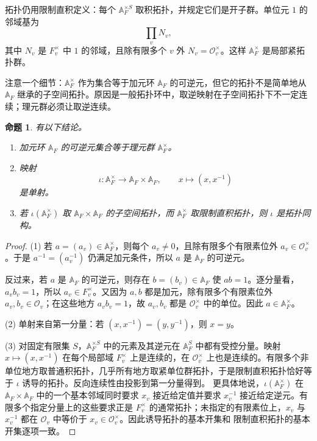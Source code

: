 \documentclass[11pt,a4paper,openany]{ctexbook}
\numberwithin{equation}{chapter}
\newcommand{\A}{\mathbb{A}}
\theoremstyle{plain}
\newtheorem{proposition}[theorem]{命题}
\theoremstyle{definition}
\theoremstyle{remark}
\begin{document}
拓扑仍用限制直积定义：每个 $\A_F^{\times S}$ 取积拓扑，并规定它们是开子群。单位元 $1$ 的邻域基为
\[
 \prod_vN_v,
\]
其中 $N_v$ 是 $F_v^\times$ 中 $1$ 的邻域，且除有限多个 $v$ 外 $N_v=\mathcal O_v^\times$。这样 $\A_F^\times$ 是局部紧拓扑群。

注意一个细节：$\A_F^\times$ 作为集合等于加元环 $\A_F$ 的可逆元，但它的拓扑不是简单地从 $\A_F$ 继承的子空间拓扑。原因是一般拓扑环中，取逆映射在子空间拓扑下不一定连续；理元群必须让取逆连续。

\begin{proposition}
有以下结论。
\begin{enumerate}[label=(\arabic*)]
\item 加元环 $\A_F$ 的可逆元集合等于理元群 $\A_F^\times$。
\item 映射
\[
 \iota:\A_F^\times\longrightarrow \A_F\times\A_F,\qquad
 x\longmapsto (x,x^{-1})
\]
是单射。
\item 若 $\iota(\A_F^\times)$ 取 $\A_F\times\A_F$ 的子空间拓扑，而 $\A_F^\times$ 取限制直积拓扑，则 $\iota$ 是拓扑同构。
\end{enumerate}
\end{proposition}

\begin{proof}
(1) 若 $a=(a_v)\in\A_F^\times$，则每个 $a_v\ne0$，且除有限多个有限素位外 $a_v\in\mathcal O_v^\times$。于是 $a^{-1}=(a_v^{-1})$ 仍满足加元条件，所以 $a$ 是 $\A_F$ 的可逆元。

反过来，若 $a$ 是 $\A_F$ 的可逆元，则存在 $b=(b_v)\in\A_F$ 使 $ab=1$。逐分量看，$a_vb_v=1$，所以 $a_v\in F_v^\times$。又因为 $a,b$ 都是加元，除有限多个有限素位外 $a_v,b_v\in\mathcal O_v$；在这些地方 $a_vb_v=1$，故 $a_v,b_v$ 都是 $\mathcal O_v^\times$ 中的单位。因此 $a\in\A_F^\times$。

(2) 单射来自第一分量：若 $(x,x^{-1})=(y,y^{-1})$，则 $x=y$。

(3) 对固定有限集 $S$，$\A_F^{\times S}$ 中的元素及其逆元在 $\A_F^S$ 中都有受控分量。映射 $x\mapsto (x,x^{-1})$ 在每个局部域 $F_v^\times$ 上是连续的，在 $\mathcal O_v^\times$ 上也是连续的。有限多个非单位地方取普通积拓扑，几乎所有地方取紧单位群拓扑，于是限制直积拓扑恰好等于 $\iota$ 诱导的拓扑。反向连续性由投影到第一分量得到。
更具体地说，$\iota(\A_F^\times)$ 在 $\A_F\times\A_F$ 中的一个基本邻域同时要求
$x_v$ 接近给定值并要求 $x_v^{-1}$ 接近给定逆元。有限多个指定分量上的这些要求正是
$F_v^\times$ 的通常拓扑；未指定的有限素位上，$x_v$ 与 $x_v^{-1}$ 都在
$\mathcal O_v$ 中等价于 $x_v\in\mathcal O_v^\times$。因此诱导拓扑的基本开集和
限制直积拓扑的基本开集逐项一致。
\end{proof}
\end{document}
